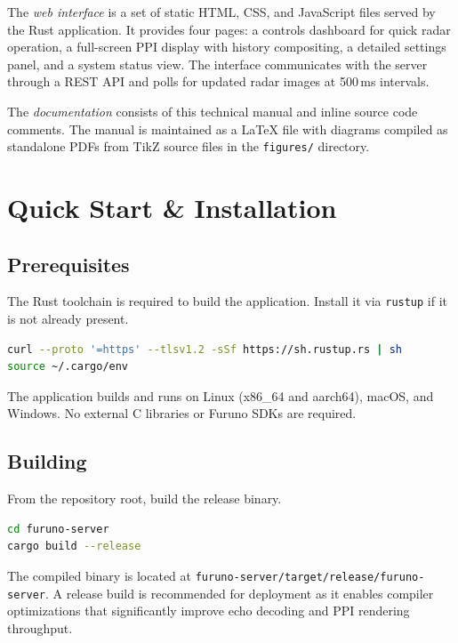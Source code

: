 \documentclass[11pt,letterpaper]{article}
\begin{document}
The \textit{web interface} is a set of static HTML, CSS, and JavaScript files served by the Rust application. It provides four pages: a controls dashboard for quick radar operation, a full-screen PPI display with history compositing, a detailed settings panel, and a system status view. The interface communicates with the server through a REST API and polls for updated radar images at 500\,ms intervals.

The \textit{documentation} consists of this technical manual and inline source code comments. The manual is maintained as a \LaTeX{} file with diagrams compiled as standalone PDFs from TikZ source files in the \texttt{figures/} directory.



\newpage
\section{Quick Start \& Installation}
\label{sec:quickstart}

\subsection{Prerequisites}
\label{subsec:prerequisites}

The Rust toolchain is required to build the application. Install it via \texttt{rustup} if it is not already present.

\begin{lstlisting}[language=bash]
curl --proto '=https' --tlsv1.2 -sSf https://sh.rustup.rs | sh
source ~/.cargo/env
\end{lstlisting}

The application builds and runs on Linux (x86\_64 and aarch64), macOS, and Windows. No external C libraries or Furuno SDKs are required.

\subsection{Building}
\label{subsec:building}

From the repository root, build the release binary.

\begin{lstlisting}[language=bash]
cd furuno-server
cargo build --release
\end{lstlisting}

The compiled binary is located at \texttt{furuno-server/target/release/furuno-server}. A release build is recommended for deployment as it enables compiler optimizations that significantly improve echo decoding and PPI rendering throughput.
\end{document}
